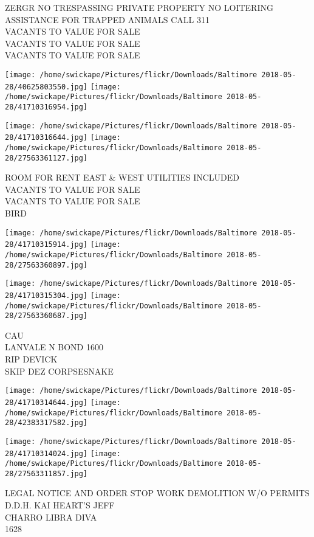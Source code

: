 \documentclass[10pt,letterpaper]{article}
\begin{document}
ZERGR NO TRESPASSING PRIVATE PROPERTY NO LOITERING ASSISTANCE FOR TRAPPED ANIMALS CALL 311\\
VACANTS TO VALUE FOR SALE\\
VACANTS TO VALUE FOR SALE\\
VACANTS TO VALUE FOR SALE\\
\pagebreak

\texttt{[image: /home/swickape/Pictures/flickr/Downloads/Baltimore 2018-05-28/40625803550.jpg]}
\texttt{[image: /home/swickape/Pictures/flickr/Downloads/Baltimore 2018-05-28/41710316954.jpg]}

\texttt{[image: /home/swickape/Pictures/flickr/Downloads/Baltimore 2018-05-28/41710316644.jpg]}
\texttt{[image: /home/swickape/Pictures/flickr/Downloads/Baltimore 2018-05-28/27563361127.jpg]}

ROOM FOR RENT EAST \& WEST UTILITIES INCLUDED\\
VACANTS TO VALUE FOR SALE\\
VACANTS TO VALUE FOR SALE\\
BIRD\\
\pagebreak

\texttt{[image: /home/swickape/Pictures/flickr/Downloads/Baltimore 2018-05-28/41710315914.jpg]}
\texttt{[image: /home/swickape/Pictures/flickr/Downloads/Baltimore 2018-05-28/27563360897.jpg]}

\texttt{[image: /home/swickape/Pictures/flickr/Downloads/Baltimore 2018-05-28/41710315304.jpg]}
\texttt{[image: /home/swickape/Pictures/flickr/Downloads/Baltimore 2018-05-28/27563360687.jpg]}

CAU\\
LANVALE N BOND 1600\\
RIP DEVICK\\
SKIP DEZ CORPSESNAKE\\
\pagebreak

\texttt{[image: /home/swickape/Pictures/flickr/Downloads/Baltimore 2018-05-28/41710314644.jpg]}
\texttt{[image: /home/swickape/Pictures/flickr/Downloads/Baltimore 2018-05-28/42383317582.jpg]}

\texttt{[image: /home/swickape/Pictures/flickr/Downloads/Baltimore 2018-05-28/41710314024.jpg]}
\texttt{[image: /home/swickape/Pictures/flickr/Downloads/Baltimore 2018-05-28/27563311857.jpg]}

LEGAL NOTICE AND ORDER STOP WORK DEMOLITION W/O PERMITS\\
D.D.H. KAI HEART'S JEFF\\
CHARRO LIBRA DIVA\\
1628\\
\pagebreak
\end{document}
